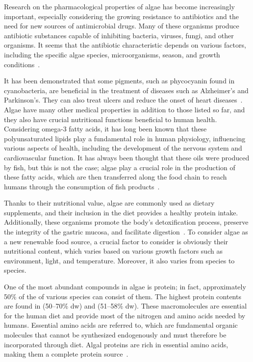 Research on the pharmacological properties of algae has become increasingly important, especially considering the growing resistance to antibiotics and the need for new sources of antimicrobial drugs. Many of these organisms produce antibiotic substances capable of inhibiting bacteria, viruses, fungi, and other organisms. It seems that the antibiotic characteristic depends on various factors, including the specific algae species, microorganisms, season, and growth conditions~\parencite{raja_biological_2013}.

It has been demonstrated that some pigments, such as phycocyanin found in cyanobacteria, are beneficial in the treatment of diseases such as Alzheimer's and Parkinson's. They can also treat ulcers and reduce the onset of heart diseases~\parencite{subhashini_Molecular_2004}. Algae have many other medical properties in addition to those listed so far, and they also have crucial nutritional functions beneficial to human health. Considering omega-3 fatty acids, it has long been known that these polyunsaturated lipids play a fundamental role in human physiology, influencing various aspects of health, including the development of the nervous system and cardiovascular function. It has always been thought that these oils were produced by fish, but this is not the case; algae play a crucial role in the production of these fatty acids, which are then transferred along the food chain to reach humans through the consumption of fish products~\parencite{mayfield_algae_2021}.

Thanks to their nutritional value, algae are commonly used as dietary supplements, and their inclusion in the diet provides a healthy protein intake. Additionally, these organisms promote the body's detoxification process, preserve the integrity of the gastric mucosa, and facilitate digestion~\parencite{scieszka_Algae_2019}. To consider algae as a new renewable food source, a crucial factor to consider is obviously their nutritional content, which varies based on various growth factors such as environment, light, and temperature. Moreover, it also varies from species to species.

One of the most abundant compounds in algae is protein; in fact, approximately 50\% of the  of various species can consist of them. The highest protein contents are found in  (50–70\% dw) and  (51–58\% dw). These macromolecules are essential for the human diet and provide most of the nitrogen and amino acids needed by humans. Essential amino acids are referred to, which are fundamental organic molecules that cannot be synthesized endogenously and must therefore be incorporated through diet. Algal proteins are rich in essential amino acids, making them a complete protein source~\parencite{torres-tiji_Microalgae_2020}.

